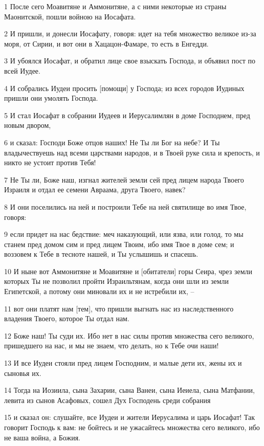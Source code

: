 \par 1 После сего Моавитяне и Аммонитяне, а с ними некоторые из страны Маонитской, пошли войною на Иосафата.
\par 2 И пришли, и донесли Иосафату, говоря: идет на тебя множество великое из-за моря, от Сирии, и вот они в Хацацон-Фамаре, то есть в Енгедди.
\par 3 И убоялся Иосафат, и обратил лице свое взыскать Господа, и объявил пост по всей Иудее.
\par 4 И собрались Иудеи просить [помощи] у Господа; из всех городов Иудиных пришли они умолять Господа.
\par 5 И стал Иосафат в собрании Иудеев и Иерусалимлян в доме Господнем, пред новым двором,
\par 6 и сказал: Господи Боже отцов наших! Не Ты ли Бог на небе? И Ты владычествуешь над всеми царствами народов, и в Твоей руке сила и крепость, и никто не устоит против Тебя!
\par 7 Не Ты ли, Боже наш, изгнал жителей земли сей пред лицем народа Твоего Израиля и отдал ее семени Авраама, друга Твоего, навек?
\par 8 И они поселились на ней и построили Тебе на ней святилище во имя Твое, говоря:
\par 9 если придет на нас бедствие: меч наказующий, или язва, или голод, то мы станем пред домом сим и пред лицем Твоим, ибо имя Твое в доме сем; и воззовем к Тебе в тесноте нашей, и Ты услышишь и спасешь.
\par 10 И ныне вот Аммонитяне и Моавитяне и [обитатели] горы Сеира, чрез земли которых Ты не позволил пройти Израильтянам, когда они шли из земли Египетской, а потому они миновали их и не истребили их, --
\par 11 вот они платят нам [тем], что пришли выгнать нас из наследственного владения Твоего, которое Ты отдал нам.
\par 12 Боже наш! Ты суди их. Ибо нет в нас силы против множества сего великого, пришедшего на нас, и мы не знаем, что делать, но к Тебе очи наши!
\par 13 И все Иудеи стояли пред лицем Господним, и малые дети их, жены их и сыновья их.
\par 14 Тогда на Иозиила, сына Захарии, сына Ванеи, сына Иеиела, сына Матфании, левита из сынов Асафовых, сошел Дух Господень среди собрания
\par 15 и сказал он: слушайте, все Иудеи и жители Иерусалима и царь Иосафат! Так говорит Господь к вам: не бойтесь и не ужасайтесь множества сего великого, ибо не ваша война, а Божия.
